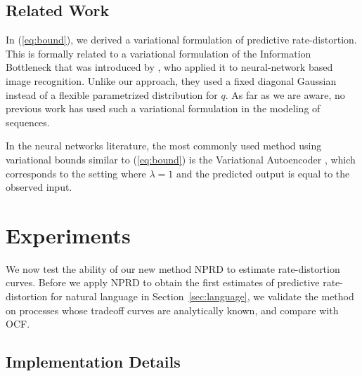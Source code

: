 \documentclass[entropy,article,submit,moreauthors,pdftex,10pt,a4paper]{Definitions/mdpi}
\begin{document}
\subsection{Related Work}
In (\ref{eq:bound}), we derived a variational formulation of predictive rate-distortion.
This is formally related to a variational formulation of the Information Bottleneck that was introduced by \cite{alemi-deep-2016}, who applied it to neural-network based image recognition.
Unlike our approach, they used a fixed diagonal Gaussian instead of a flexible parametrized distribution for $q$.
As far as we are aware, no previous work has used such a variational formulation in the modeling of sequences.

In the neural networks literature, the most commonly used method using variational bounds similar to (\ref{eq:bound}) is the Variational Autoencoder \citep{kingma-auto-encoding-2014, bowman-generating-2016}, which corresponds to the setting where $\lambda=1$ and the predicted output is equal to the observed input.






\section{Experiments}\label{sec:experiments}
We now test the ability of our new method NPRD to estimate rate-distortion curves.
Before we apply NPRD to obtain the first estimates of predictive rate-distortion for natural language in Section~\ref{sec:language}, we validate the method on processes whose tradeoff curves are analytically known, and compare with OCF.

\subsection{Implementation Details}
\end{document}
